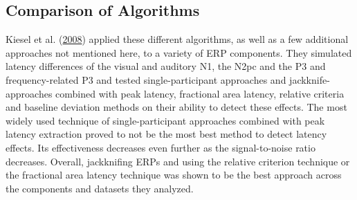 \documentclass[
  man]{apa7}
\begin{document}
\hypertarget{comparison-of-algorithms}{%
\subsection{Comparison of Algorithms}\label{comparison-of-algorithms}}

Kiesel et al. (\protect\hyperlink{ref-kiesel2008measurement}{2008}) applied these different algorithms, as well as a few additional approaches not mentioned here, to a variety of ERP components. They simulated latency differences of the visual and auditory N1, the N2pc and the P3 and frequency-related P3 and tested single-participant approaches and jackknife-approaches combined with peak latency, fractional area latency, relative criteria and baseline deviation methods on their ability to detect these effects. The most widely used technique of single-participant approaches combined with peak latency extraction proved to not be the most best method to detect latency effects. Its effectiveness decreases even further as the signal-to-noise ratio decreases. Overall, jackknifing ERPs and using the relative criterion technique or the fractional area latency technique was shown to be the best approach across the components and datasets they analyzed.
\end{document}
